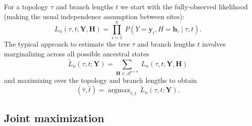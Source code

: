 \documentclass[a4paper]{article}
\newcommand{\alphabet}{\mathcal{A}}
\newcommand{\fullAlignment}{\mathbf{Y}}
\newcommand{\alignmentColumn}{\mathbf{y}}
\newcommand{\alignmentColumnRV}{Y}
\newcommand{\fullAncestralStates}{\mathbf{H}}
\newcommand{\ancestralStateColumn}{\mathbf{h}}
\newcommand{\ancestralStateColumnRV}{H}
\newcommand{\nCols}{n}
\newcommand{\nAncestralStateRows}{p}
\DeclareMathOperator*{\argmax}{argmax}
\begin{document}
For a topology $\tau$ and branch lengths $t$ we start with the fully-observed likelihood (making the usual independence assumption between sites):
\begin{equation}
\label{eq:full_likelihood}
L_\nCols(\tau, t; \fullAlignment,\fullAncestralStates) = \prod_{i=1}^{\nCols} \ P(\alignmentColumnRV=\alignmentColumn_i, \ancestralStateColumnRV=\ancestralStateColumn_i \mid \tau, t).
\end{equation}
The typical approach to estimate the tree $\tau$ and branch lengths $t$ involves marginalizing across all possible ancestral states
\begin{equation}
\label{eq:marginal_likelihood}
\tilde{L}_\nCols(\tau, t; \fullAlignment) = \sum_{\fullAncestralStates\in\alphabet^{\nAncestralStateRows\times\nCols}} \ L_\nCols(\tau, t; \fullAlignment, \fullAncestralStates)
\end{equation}
and maximizing over the topology and branch lengths to obtain
$$
(\hat{\tau}, \hat{t}) = \argmax_{\tau, t} \  \tilde{L}_\nCols(\tau, t; \fullAlignment).
$$

\subsection{Joint maximization}
\end{document}
